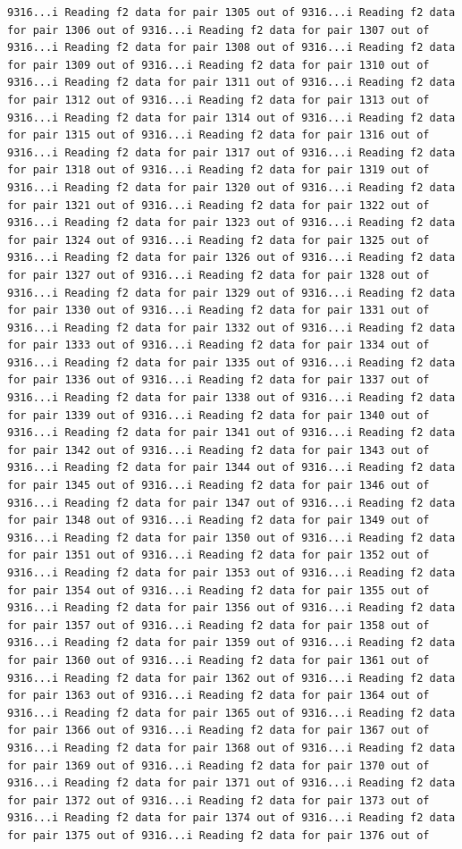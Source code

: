 \documentclass[
]{article}
\begin{document}
\begin{verbatim}
9316...i Reading f2 data for pair 1305 out of 9316...i Reading f2 data for pair 1306 out of 9316...i Reading f2 data for pair 1307 out of 9316...i Reading f2 data for pair 1308 out of 9316...i Reading f2 data for pair 1309 out of 9316...i Reading f2 data for pair 1310 out of 9316...i Reading f2 data for pair 1311 out of 9316...i Reading f2 data for pair 1312 out of 9316...i Reading f2 data for pair 1313 out of 9316...i Reading f2 data for pair 1314 out of 9316...i Reading f2 data for pair 1315 out of 9316...i Reading f2 data for pair 1316 out of 9316...i Reading f2 data for pair 1317 out of 9316...i Reading f2 data for pair 1318 out of 9316...i Reading f2 data for pair 1319 out of 9316...i Reading f2 data for pair 1320 out of 9316...i Reading f2 data for pair 1321 out of 9316...i Reading f2 data for pair 1322 out of 9316...i Reading f2 data for pair 1323 out of 9316...i Reading f2 data for pair 1324 out of 9316...i Reading f2 data for pair 1325 out of 9316...i Reading f2 data for pair 1326 out of 9316...i Reading f2 data for pair 1327 out of 9316...i Reading f2 data for pair 1328 out of 9316...i Reading f2 data for pair 1329 out of 9316...i Reading f2 data for pair 1330 out of 9316...i Reading f2 data for pair 1331 out of 9316...i Reading f2 data for pair 1332 out of 9316...i Reading f2 data for pair 1333 out of 9316...i Reading f2 data for pair 1334 out of 9316...i Reading f2 data for pair 1335 out of 9316...i Reading f2 data for pair 1336 out of 9316...i Reading f2 data for pair 1337 out of 9316...i Reading f2 data for pair 1338 out of 9316...i Reading f2 data for pair 1339 out of 9316...i Reading f2 data for pair 1340 out of 9316...i Reading f2 data for pair 1341 out of 9316...i Reading f2 data for pair 1342 out of 9316...i Reading f2 data for pair 1343 out of 9316...i Reading f2 data for pair 1344 out of 9316...i Reading f2 data for pair 1345 out of 9316...i Reading f2 data for pair 1346 out of 9316...i Reading f2 data for pair 1347 out of 9316...i Reading f2 data for pair 1348 out of 9316...i Reading f2 data for pair 1349 out of 9316...i Reading f2 data for pair 1350 out of 9316...i Reading f2 data for pair 1351 out of 9316...i Reading f2 data for pair 1352 out of 9316...i Reading f2 data for pair 1353 out of 9316...i Reading f2 data for pair 1354 out of 9316...i Reading f2 data for pair 1355 out of 9316...i Reading f2 data for pair 1356 out of 9316...i Reading f2 data for pair 1357 out of 9316...i Reading f2 data for pair 1358 out of 9316...i Reading f2 data for pair 1359 out of 9316...i Reading f2 data for pair 1360 out of 9316...i Reading f2 data for pair 1361 out of 9316...i Reading f2 data for pair 1362 out of 9316...i Reading f2 data for pair 1363 out of 9316...i Reading f2 data for pair 1364 out of 9316...i Reading f2 data for pair 1365 out of 9316...i Reading f2 data for pair 1366 out of 9316...i Reading f2 data for pair 1367 out of 9316...i Reading f2 data for pair 1368 out of 9316...i Reading f2 data for pair 1369 out of 9316...i Reading f2 data for pair 1370 out of 9316...i Reading f2 data for pair 1371 out of 9316...i Reading f2 data for pair 1372 out of 9316...i Reading f2 data for pair 1373 out of 9316...i Reading f2 data for pair 1374 out of 9316...i Reading f2 data for pair 1375 out of 9316...i Reading f2 data for pair 1376 out of 
\end{verbatim}
\end{document}
